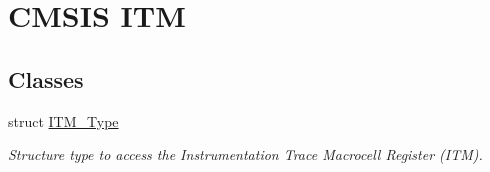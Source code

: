 \hypertarget{group___c_m_s_i_s___i_t_m}{\section{\-C\-M\-S\-I\-S \-I\-T\-M}
\label{group___c_m_s_i_s___i_t_m}
}
\subsection*{\-Classes}
\begin{DoxyCompactItemize}
\item 
struct \hyperlink{struct_i_t_m___type}{\-I\-T\-M\-\_\-\-Type}
\begin{DoxyCompactList}\small\item\em \-Structure type to access the \-Instrumentation \-Trace \-Macrocell \-Register (\-I\-T\-M). \end{DoxyCompactList}\end{DoxyCompactItemize}
